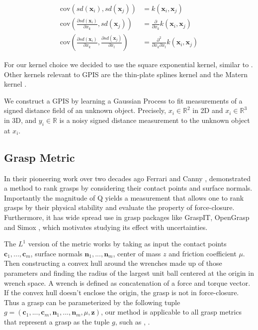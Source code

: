 \documentclass[letterpaper, 10 pt, conference]{ieeeconf}  %
\newcommand{\bx}{\mathbf{x}}
\begin{document}
\vspace{-2ex}
\begin{align}
	\text{cov}\left(sd(\bx_i), sd(\bx_j) \right) &=  k(\bx_i, \bx_j) \\
	\text{cov}\left(\frac{\partial sd (\bx_i)}{\partial x_k}, sd(\bx_j) \right) &= \frac{\partial}{\partial x_k} k(\bx_i, \bx_j) \label{eq:mean_gradient}\\
	\text{cov}\left(\frac{\partial sd (\bx_i)}{\partial x_k}, \frac{\partial sd (\bx_j)}{\partial x_l} \right) &= \frac{\partial^2}{\partial x_k \partial x_l} k(\bx_i, \bx_j)\label{eq:cov_gradient}
\end{align}


For our kernel choice we decided to use the square exponential kernel, similar to \cite{dragiev2011}. Other kernels relevant to GPIS are the thin-plate splines kernel and the Matern kernel \cite{williams2007}. 


We construct a GPIS by learning a Gaussian Process to fit measurements of a signed distance field of an unknown object.  Precisely, $x_i \in \mathbb{R}^2$ in 2D and $x_i \in \mathbb{R}^3$ in 3D, and $y_i \in \mathbb{R}$ is a noisy signed distance measurement to the unknown object at $x_i$.

\subsection{Grasp Metric}
In their pioneering work over two decades ago Ferrari and Canny \cite{ferrari1992}, demonstrated a method to rank grasps by considering their contact points and surface normals. Importantly the magnitude of Q yields a measurement that allows one to rank grasps by their physical stability and evaluate the property of force-closure. Furthermore, it has wide spread use in grasp packages like GraspIT\cite{miller2004graspit}, OpenGrasp\cite{73} and Simox \cite{vahrenkamp2010simo}, which motivates studying its effect with uncertainties. 

The $L^1$ version of the metric works by taking as input the contact points $\textbf{c}_1,...,\textbf{c}_m$, surface normals $\textbf{n}_1,...,\textbf{n}_m$, center of mass $z$ and friction coefficient $\mu$. Then constructing a convex hull around the wrenches made up of those parameters and finding the radius of the largest unit ball centered at the origin in wrench space. A wrench is defined as concatenation of a force and torque vector.  If the convex hull doesn't enclose the origin, the grasp is not in force-closure. Thus a grasp can be parameterized by the following tuple $g = ( \textbf{c}_1,...,\textbf{c}_m,\textbf{n}_1,...,\textbf{n}_m,\mu, \textbf{z} )$, our method is applicable to all grasp metrics that represent a grasp as the tuple $g$, such as \cite{christopoulos2007handling}, \cite{li1988task}. 
\end{document}
